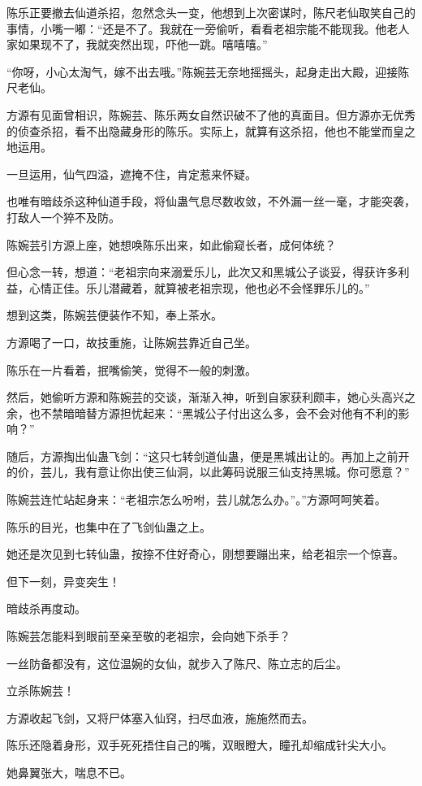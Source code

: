 \begin{this_body}
陈乐正要撤去仙道杀招，忽然念头一变，他想到上次密谋时，陈尺老仙取笑自己的事情，小嘴一嘟：“还是不了。我就在一旁偷听，看看老祖宗能不能现我。他老人家如果现不了，我就突然出现，吓他一跳。嘻嘻嘻。”

“你呀，小心太淘气，嫁不出去哦。”陈婉芸无奈地摇摇头，起身走出大殿，迎接陈尺老仙。

方源有见面曾相识，陈婉芸、陈乐两女自然识破不了他的真面目。但方源亦无优秀的侦查杀招，看不出隐藏身形的陈乐。实际上，就算有这杀招，他也不能堂而皇之地运用。

一旦运用，仙气四溢，遮掩不住，肯定惹来怀疑。

也唯有暗歧杀这种仙道手段，将仙蛊气息尽数收敛，不外漏一丝一毫，才能突袭，打敌人一个猝不及防。

陈婉芸引方源上座，她想唤陈乐出来，如此偷窥长者，成何体统？

但心念一转，想道：“老祖宗向来溺爱乐儿，此次又和黑城公子谈妥，得获许多利益，心情正佳。乐儿潜藏着，就算被老祖宗现，他也必不会怪罪乐儿的。”

想到这类，陈婉芸便装作不知，奉上茶水。

方源喝了一口，故技重施，让陈婉芸靠近自己坐。

陈乐在一片看着，抿嘴偷笑，觉得不一般的刺激。

然后，她偷听方源和陈婉芸的交谈，渐渐入神，听到自家获利颇丰，她心头高兴之余，也不禁暗暗替方源担忧起来：“黑城公子付出这么多，会不会对他有不利的影响？”

随后，方源掏出仙蛊飞剑：“这只七转剑道仙蛊，便是黑城出让的。再加上之前开的价，芸儿，我有意让你出使三仙洞，以此筹码说服三仙支持黑城。你可愿意？”

陈婉芸连忙站起身来：“老祖宗怎么吩咐，芸儿就怎么办。”。”方源呵呵笑着。

陈乐的目光，也集中在了飞剑仙蛊之上。

她还是次见到七转仙蛊，按捺不住好奇心，刚想要蹦出来，给老祖宗一个惊喜。

但下一刻，异变突生！

暗歧杀再度动。

陈婉芸怎能料到眼前至亲至敬的老祖宗，会向她下杀手？

一丝防备都没有，这位温婉的女仙，就步入了陈尺、陈立志的后尘。

立杀陈婉芸！

方源收起飞剑，又将尸体塞入仙窍，扫尽血液，施施然而去。

陈乐还隐着身形，双手死死捂住自己的嘴，双眼瞪大，瞳孔却缩成针尖大小。

她鼻翼张大，喘息不已。


\end{this_body}
